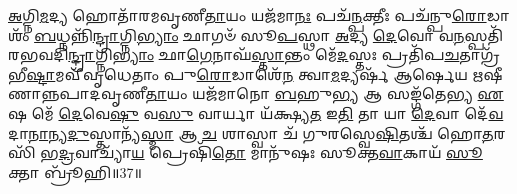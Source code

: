 \-\ul{𑌅}\-𑌗𑍍𑌨𑌿\-\ul{𑌮}\-𑌦𑍍𑌯 𑌹𑍋𑌤𑌾᳴𑌰𑌮𑌵𑍃𑌣𑍀\-\ul{𑌤𑌾}\-𑌯𑌂 𑌯𑌜᳴𑌮𑌾\-\ul{𑌨𑌃} 𑌪𑌚᳴\-\ul{𑌨𑍍𑌪}\-𑌕𑍍𑌤𑍀𑌃 𑌪𑌚᳴𑌨𑍍𑌪𑍁\-\ul{𑌰𑍋}\-𑌡𑌾𑌶𑌂᳴ \ul{𑌬}\-𑌧𑍍𑌨𑌨𑍍𑌨𑌿᳴\-\ul{𑌨𑍍𑌦𑍍𑌰𑌾}\-𑌗𑍍𑌨𑌿\-\ul{𑌭𑍍𑌯𑌾𑌂} 𑌛𑌾𑌗𑍞᳴ 𑌸𑍂\-\ul{𑌪}\-𑌸𑍍𑌥𑌾 \ul{𑌅}\-𑌦𑍍𑌯 \ul{𑌦𑍇}\-𑌵𑍋 𑌵\-\ul{𑌨}\-𑌸𑍍𑌪𑌤𑌿᳴𑌰𑌭𑌵𑌦𑌿\-\ul{𑌨𑍍𑌦𑍍𑌰𑌾}\-𑌗𑍍𑌨𑌿\-\ul{𑌭𑍍𑌯𑌾𑌂} 𑌛𑌾\-\ul{𑌗𑍇}\-𑌨𑌾𑌘᳴\-\ul{𑌸𑍍𑌤𑌾}\-𑌨𑍍𑌤𑌂 𑌮𑍇᳴\-\ul{𑌦}\-𑌸𑍍𑌤𑌃 𑌪𑍍𑌰𑌤𑌿᳴\-𑌪\-\ul{𑌚}\-𑌤𑌾𑌗𑍍𑌰᳴𑌭𑍀\-\ul{𑌷𑍍𑌟𑌾}\-𑌮𑌵𑍀᳴𑌵𑍃𑌧𑍇𑌤𑌾𑌂 𑌪𑍁\-\ul{𑌰𑍋}\-𑌡𑌾𑌶𑍇᳴\-\ul{𑌨} 𑌤𑍍𑌵𑌾\-\ul{𑌮}\-𑌦𑍍𑌯𑌰𑍍\mbox{}𑌷᳴ 𑌆𑌰𑍍\mbox{}𑌷𑍇𑌯 𑌋𑌷𑍀𑌣𑌾𑌨𑍍𑌨𑌪𑌾𑌦𑌵𑍃𑌣𑍀\-\ul{𑌤𑌾}\-𑌯𑌂 𑌯𑌜᳴𑌮𑌾𑌨𑍋 \ul{𑌬}\-𑌹𑍁\-\ul{𑌭𑍍𑌯} 𑌆 𑌸𑌙𑍍𑌗᳴𑌤𑍇𑌭𑍍𑌯 \ul{𑌏}\-𑌷 𑌮𑍇᳴ \ul{𑌦𑍇}\-𑌵𑍇\-\ul{𑌷𑍁} 𑌵\-\ul{𑌸𑍁} 𑌵𑌾𑌰𑍍𑌯𑌾 𑌯᳴𑌕𑍍𑌷𑍍𑌯\-\ul{𑌤} 𑌇\-\ul{𑌤𑌿} 𑌤𑌾 𑌯𑌾 \ul{𑌦𑍇}\-𑌵𑌾 𑌦𑍇᳴\-\ul{𑌵}\-𑌦𑌾\-\ul{𑌨𑌾}\-𑌨𑍍𑌯\-\ul{𑌦𑍁}\-𑌸𑍍𑌤𑌾𑌨𑍍𑌯᳴\-\ul{𑌸𑍍𑌮𑌾} 𑌆 \ul{𑌚} 𑌶𑌾𑌸𑍍𑌵𑌾 𑌚᳴ 𑌗𑍁𑌰𑌸𑍍𑌵𑍇\-\ul{𑌷𑌿}\-𑌤𑌶𑍍𑌚᳴ 𑌹𑍋\-\ul{𑌤}\-𑌰𑌸𑌿᳴ 𑌭\-\ul{𑌦𑍍𑌰}\-𑌵𑌾𑌚𑍍𑌯𑌾᳴\-\ul{𑌯} 𑌪𑍍𑌰𑍇𑌷𑌿᳴\-\ul{𑌤𑍋} 𑌮𑌾𑌨𑍁᳴𑌷𑌃 𑌸𑍂𑌕𑍍𑌤\-\ul{𑌵𑌾}\-𑌕𑌾𑌯᳴ \ul{𑌸𑍂}\-𑌕𑍍𑌤𑌾 𑌬𑍍𑌰𑍂᳴𑌹𑌿॥37॥\anuvakamend[\-\ul{𑌅}\-𑌗𑍍𑌨𑌿\-\ul{𑌮}\-𑌦𑍍𑌯𑍈𑌕𑌮𑍍॑]






